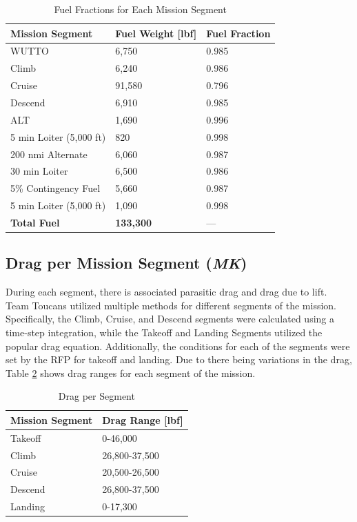 \begin{table}[!h]
    \centering
    \caption{Fuel Fractions for Each Mission Segment}
    \begin{tabular}{|p{1.75in}|p{1in}|p{1in}|}\toprule 
    \textbf{Mission Segment} & \textbf{Fuel Weight [lbf]} & \textbf{Fuel Fraction}\\ \hline 
    WUTTO & 6,750 & 0.985 \\ \hline
    Climb & 6,240 & 0.986  \\ \hline
    Cruise & 91,580 & 0.796 \\ \hline
    Descend & 6,910 & 0.985 \\ \hline
    ALT & 1,690 & 0.996 \\ \hline
    5 min Loiter (5,000 ft) & 820 & 0.998\\ \hline
    200 nmi Alternate & 6,060 & 0.987 \\ \hline
    30 min Loiter & 6,500 & 0.986 \\ \hline
    5\% Contingency Fuel & 5,660 & 0.987 \\ \hline
    5 min Loiter (5,000 ft) & 1,090 & 0.998 \\ \hline
    \textbf{Total Fuel} & \textbf{133,300} & --- \\
    \bottomrule
    \end{tabular}
    \label{fuelfrac}
\end{table}

\subsection{Drag per Mission Segment (\textit{MK})}
During each segment, there is associated parasitic drag and drag due to lift. Team Toucans utilized multiple methods for different segments of the mission. Specifically, the Climb, Cruise, and Descend segments were calculated using a time-step integration, while the Takeoff and Landing Segments utilized the popular drag equation. Additionally, the conditions for each of the segments were set by the RFP for takeoff and landing. Due to there being variations in the drag, Table \ref{dragseg} shows drag ranges for each segment of the mission. 

\begin{table}[H]
    \centering
    \caption{Drag per Segment}
    \begin{tabular}{|p{1.5in}|p{1in}|}\toprule 
    \textbf{Mission Segment} & \textbf{Drag Range [lbf]} \\ \hline 
    Takeoff & 0-46,000 \\ \hline
    Climb & 26,800-37,500   \\ \hline
    Cruise & 20,500-26,500 \\ \hline
    Descend & 26,800-37,500 \\ \hline
    Landing & 0-17,300 \\
    \bottomrule
    \end{tabular}
    \label{dragseg}
\end{table}

